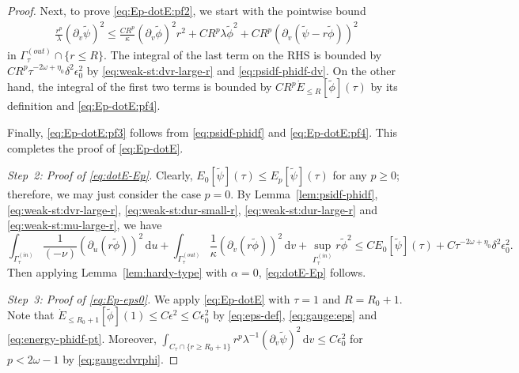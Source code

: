 \documentclass[10pt, reqno]{amsart}
\theoremstyle{definition}
\theoremstyle{remark}
\theoremstyle{conjecture}
\numberwithin{equation}{section}
\newcommand{\set}[1]{\{#1\}}
\newcommand{\ud}{\mathrm{d}}
\newcommand{\rd}{\partial}
\newcommand{\0}{\emptyset}
\newcommand{\alp}{\alpha}
\newcommand{\Gmm}{\Gamma}
\newcommand{\dlt}{\delta}
\newcommand{\eps}{\epsilon}
\newcommand{\kpp}{\kappa}
\newcommand{\lmb}{\lambda}
\newcommand{\omg}{\omega}
\newcommand{\dur}{\nu}
\newcommand{\dvr}{\lmb}
\newcommand{\pfstep}[1]{\vspace{.5em} {\it \noindent #1.}}
\newcommand{\phibg}{\overline{\phi}}				%
\newcommand{\psibg}{\overline{\psi}}				%
\newcommand{\phidf}{\widetilde{\phi}}				%
\newcommand{\psidf}{\widetilde{\psi}}				%
\begin{document}
\begin{proof}
Next, to prove \eqref{eq:Ep-dotE:pf2}, we start with the pointwise bound
\begin{align*}
	\frac{r^{p}}{\dvr} (\rd_{v} \psidf)^{2}
	\leq \frac{C R^{p}}{\kpp} (\rd_{v} \phidf)^{2} r^{2} + C R^{p} \dvr \phidf^{2} + C R^{p} (\rd_{v} (\psidf - r \phidf))^{2} 
\end{align*}
in $\Gmm_{\tau}^{(out)} \cap \set{r \leq R}$. The integral of the last term on the RHS is bounded by $C R^{p} \tau^{-2\omg + \eta_{0}} \dlt^{2} \eps_{0}^{2}$ by \eqref{eq:weak-st:dvr-large-r} and \eqref{eq:psidf-phidf-dv}. On the other hand, the integral of the first two terms is bounded by $C R^{p} \dot{E}_{\leq R} [\phidf](\tau)$ by its definition and \eqref{eq:Ep-dotE:pf4}.

Finally, \eqref{eq:Ep-dotE:pf3} follows from \eqref{eq:psidf-phidf} and \eqref{eq:Ep-dotE:pf4}. This completes the proof of \eqref{eq:Ep-dotE}.

\pfstep{Step~2: Proof of \eqref{eq:dotE-Ep}}
Clearly, $E_{0}[\psidf](\tau) \leq E_{p}[\psidf](\tau)$ for any $p \geq 0$; therefore, we may just consider the case $p = 0$. By Lemma~\ref{lem:psidf-phidf}, \eqref{eq:weak-st:dvr-large-r}, \eqref{eq:weak-st:dur-small-r}, \eqref{eq:weak-st:dur-large-r} and \eqref{eq:weak-st:mu-large-r}, we have
\begin{equation*}
	\int_{\Gmm^{(in)}_{\tau}} \frac{1}{(-\dur)} (\rd_{u} (r \phidf))^{2} \, \ud u
	+ \int_{\Gmm^{(out)}_{\tau}} \frac{1}{\kpp} (\rd_{v} (r \phidf))^{2} \, \ud v
	+ \sup_{\Gmm^{(in)}_{\tau}} r \phidf^{2}
	\leq C E_{0}[\psidf](\tau) + C \tau^{-2 \omg + \eta_{0}} \dlt^{2} \eps_{0}^{2}. 
\end{equation*}
Then applying Lemma~\ref{lem:hardy-type} with $\alp = 0$, \eqref{eq:dotE-Ep} follows.

\pfstep{Step~3: Proof of \eqref{eq:Ep-eps0}}
We apply \eqref{eq:Ep-dotE} with $\tau = 1$ and $R = R_{0} + 1$. Note that $\dot{E}_{\leq R_{0} + 1}[\phidf](1) \leq C \eps^{2} \leq C \eps_{0}^{2}$ by \eqref{eq:eps-def}, \eqref{eq:gauge:eps} and \eqref{eq:energy-phidf-pt}. Moreover, $\int_{C_{\tau} \cap \set{r \geq R_{0}+1}} r^{p} \dvr^{-1} (\rd_{v} \psidf)^{2} \, \ud v \leq C \eps_{0}^{2}$ for $p < 2 \omg - 1$ by \eqref{eq:gauge:dvrphi}. \qedhere
\end{proof}
\end{document}
